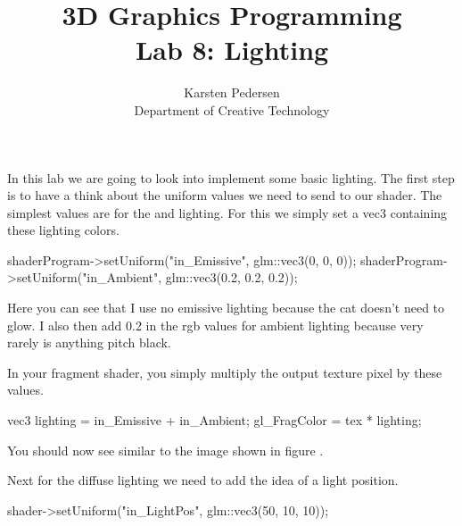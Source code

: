\documentclass[10pt]{article}
\begin{document}
\title{3D Graphics Programming \\
  \large Lab 8: Lighting}

\author{Karsten Pedersen\\ Department of Creative Technology}
\maketitle

In this lab we are going to look into implement some basic lighting.
The first step is to have a think about the uniform values we need to
send to our shader.  The simplest values are for the 
and  lighting. For this we simply set a vec3 containing
these lighting colors.

\begin{Code}

shaderProgram->setUniform("in_Emissive", glm::vec3(0, 0, 0));
shaderProgram->setUniform("in_Ambient", glm::vec3(0.2, 0.2, 0.2));

\end{Code}

Here you can see that I use no emissive lighting because the cat doesn't need to glow.
I also then add 0.2 in the rgb values for ambient lighting because very rarely is anything pitch black.

In your fragment shader, you simply multiply the output texture pixel by these values.

\begin{Code}

vec3 lighting = in_Emissive + in_Ambient;
gl_FragColor = tex * lighting;

\end{Code}

You should now see similar to the image shown in figure .


Next for the diffuse lighting we need to add the idea of a light position.

\begin{Code}

shader->setUniform("in_LightPos", glm::vec3(50, 10, 10));

\end{Code}
\end{document}
